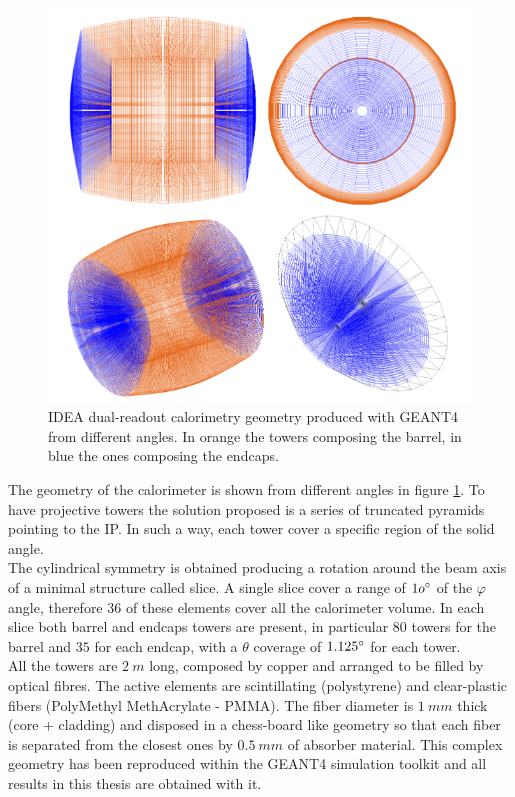 \begin{figure}
	\centering
	\includegraphics[width=.9\textwidth]{IMG/Cap1/DRCal_geo.png}
	\caption{IDEA dual-readout calorimetry geometry produced with GEANT4 from different angles. In orange the towers composing the barrel, in blue the ones composing the endcaps.}
	\label{fig:DRCal_geo}
\end{figure}

The geometry of the calorimeter is shown from different angles in figure \ref{fig:DRCal_geo}. To have projective towers the solution proposed is a series of truncated pyramids pointing to the IP. In such a way, each tower cover a specific region of the solid angle.\\
The cylindrical symmetry is obtained producing a rotation around the beam axis of a minimal structure called slice. A single slice cover a range of $1o\degree$ of the $\varphi$ angle, therefore $36$ of these elements cover all the calorimeter volume.
In each slice both barrel and endcaps towers are present, in particular $80$ towers for the barrel and $35$ for each endcap, with a $\theta$ coverage of $1.125\degree$ for each tower.\\
All the towers are $2\ m$ long, composed by copper and arranged to be filled by optical fibres.
The active elements are scintillating (polystyrene) and clear-plastic  fibers (PolyMethyl MethAcrylate - PMMA).
The fiber diameter is $1\ mm$ thick (core + cladding) and disposed in a chess-board like geometry so that each fiber is separated from the closest ones by $0.5\ mm$ of absorber material.
This complex geometry has been reproduced within the GEANT4 simulation toolkit \cite{GEANT4} and all results in this thesis are obtained with it.

